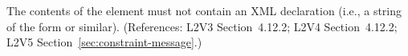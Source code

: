 The contents of the  element must not contain an XML
declaration (i.e., a string of the form  or similar).  (References: L2V3
Section~4.12.2; L2V4 Section~4.12.2; L2V5 Section~\ref{sec:constraint-message}.)
